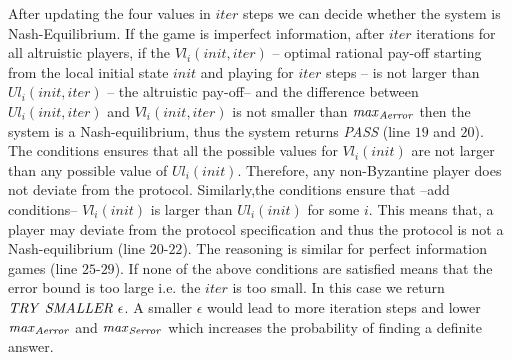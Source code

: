 After updating the four values in $iter$ steps we can decide whether the system is Nash-Equilibrium. If the game is imperfect information, after $iter$ iterations for all altruistic players, if the $Vl_i(init,iter)$ -- optimal rational pay-off starting from the local initial state $init$ and playing for $iter$ steps -- is not larger than $Ul_i(init,iter)$ -- the altruistic pay-off-- and the difference between $Ul_i(init,iter)$ and $Vl_i(init,iter)$ is not smaller than $\mathit{max}_{\mathit{Aerror}}$ then the system is a Nash-equilibrium, thus the system returns \textit{PASS} (line $19$ and $20$). The conditions ensures that all the possible values for $Vl_i(init)$ are not larger than any possible value of $Ul_i(init)$. Therefore, any non-Byzantine player does not deviate from the protocol. Similarly,the conditions ensure that --add conditions-- $Vl_i(init)$ is larger than $Ul_i(init)$ for some $i$. This means that, a player may deviate from the protocol specification and thus the protocol is not a Nash-equilibrium (line $20$-$22$). The reasoning is similar for perfect information games (line $25$-$29$). If none of the above conditions are satisfied means that the error bound is too large i.e. the $iter$ is too small. In this case we return $\mathit{TRY}\ \mathit{SMALLER}\ \epsilon$. A smaller $\epsilon$ would lead to more iteration steps and lower $\mathit{max}_{\mathit{Aerror}}$ and $\mathit{max}_{\mathit{Serror}}$ which increases the probability of finding a definite answer. 


